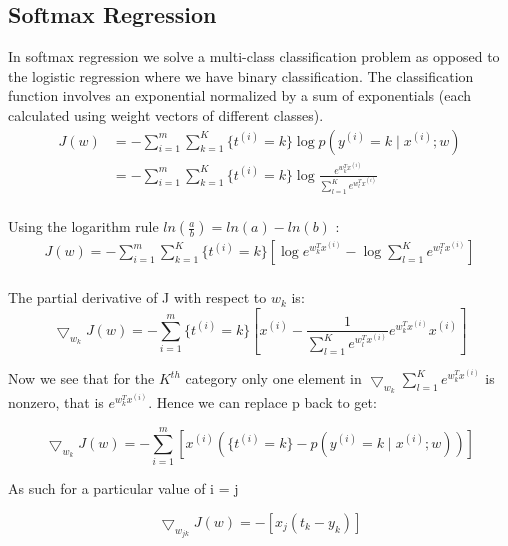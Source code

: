 \documentclass[11pt,twoside]{article}
\begin{document}
\subsection{Softmax Regression}
In softmax regression we solve a multi-class classification problem as opposed to the logistic regression where we have binary classification. The classification function involves an exponential normalized by a sum of exponentials (each calculated using weight vectors of different classes).
\begin{equation}
\begin{split}
J(w) &= -\sum^m_{i=1}\sum^K_{k=1}\{ t^{(i)} = k \}\log p(y^{(i)} =  k \mid x^{(i)} ;w)\\
& = - \sum^m_{i=1} \sum^K_{k=1} \{t^{(i)}=k\} \log \frac{e^{w^T_k x^{(i)}}}{\sum^K_{l=1}e^{w^T_l x^{(i)}}} \\
\end{split}
\end{equation}

Using the logarithm rule $ln(\frac{a}{b}) = ln(a)-ln(b)$ :
\begin{equation}
\begin{split}
J(w)  =- \sum^m_{i=1} \sum^K_{k=1} \{t^{(i)}=k\}[\log e^{w^T_kx^{(i)}}-\log \sum^K_{l=1}e^{w^T_lx^{(i)}}]\\
\end{split}
\end{equation}

The partial derivative of J with respect to $w_{k}$ is:
\begin{equation}
\bigtriangledown_{ w_k }J( w ) = - \sum^m_{i=1} \{t^{(i)}=k\}[x^{(i)}-\frac{1}{\sum^K_{l=1}e^{w^T_lx^{(i)}}}e^{w^T_kx^{(i)}}x^{(i)}]
\end{equation}

Now we see that for the $K^{th}$ category only one element in $\bigtriangledown_{ w_k} \sum^K_{l=1}e^{w^T_kx^{(i)}}$ is nonzero, that is $e^{w^T_kx^{(i)}}$. Hence we can replace p back to get:

\begin{equation}
\bigtriangledown_{ w_k }J( w ) = -\sum^{m}_{i=1} [x^{(i)} (\{ t^{(i)} = k \} - p(y^{(i)} =  k \mid x^{(i)} ; w) ) ]
\end{equation}

As such for a particular value of i = j

\begin{equation}
\bigtriangledown_{ w_{jk} }J( w ) = - [x_{j} ( t_{k} - y_{k})] 
\end{equation}
\end{document}
